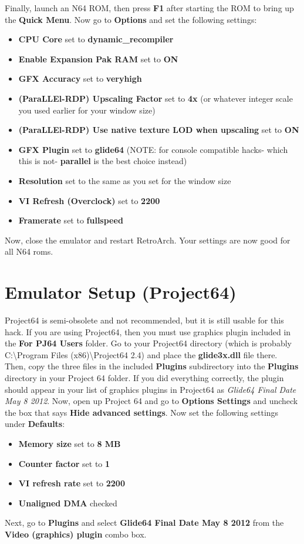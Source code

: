 \documentclass[11pt]{article}
\begin{document}
\bigbreak
Finally, launch an N64 ROM, then press \textbf{F1} after starting the ROM to bring up the \textbf{Quick Menu}. Now go to \textbf{Options} and set the following settings:
\begin{itemize}
	\item \textbf{CPU Core} set to \textbf{dynamic_recompiler}
	\item \textbf{Enable Expansion Pak RAM} set to \textbf{ON}
	\item \textbf{GFX Accuracy} set to \textbf{veryhigh}
	\item \textbf{(ParaLLEl-RDP) Upscaling Factor} set to \textbf{4x} (or whatever integer scale you used earlier for your window size)
	\item \textbf{(ParaLLEl-RDP) Use native texture LOD when upscaling} set to \textbf{ON}
	\item \textbf{GFX Plugin} set to \textbf{glide64} (NOTE: for console compatible hacks- which this is not- \textbf{parallel} is the best choice instead)
	\item \textbf{Resolution} set to the same as you set for the window size
	\item \textbf{VI Refresh (Overclock)} set to \textbf{2200}
	\item \textbf{Framerate} set to \textbf{fullspeed}
\end{itemize}
\bigbreak
Now, close the emulator and restart RetroArch. Your settings are now good for all N64 roms.
	
\section{Emulator Setup (Project64)}
Project64 is semi-obsolete and not recommended, but it is still usable for this hack. If you are using Project64, then you must use graphics plugin included in the \textbf{For PJ64 Users} folder. Go to your Project64 directory (which is probably C:\textbackslash{}Program Files (x86)\textbackslash{}Project64 2.4) and place the \textbf{glide3x.dll} file there. Then, copy the three files in the included \textbf{Plugins} subdirectory into the \textbf{Plugins} directory in your Project 64 folder. If you did everything correctly, the plugin should appear in your list of graphics plugins in Project64 as \textit{Glide64 Final Date May 8 2012}.
	Now, open up Project 64 and go to \textbf{Options \textrightarrow Settings} and uncheck the box that says \textbf{Hide advanced settings}. Now set the following settings under \textbf{Defaults}:
\begin{itemize}
	\item \textbf{Memory size} set to \textbf{8 MB}
	\item \textbf{Counter factor} set to \textbf{1}
	\item \textbf{VI refresh rate} set to \textbf{2200}
	\item \textbf{Unaligned DMA} checked
\end{itemize}
Next, go to \textbf{Plugins} and select \textbf{Glide64 Final Date May 8 2012} from the \textbf{Video (graphics) plugin} combo box.
\end{document}
